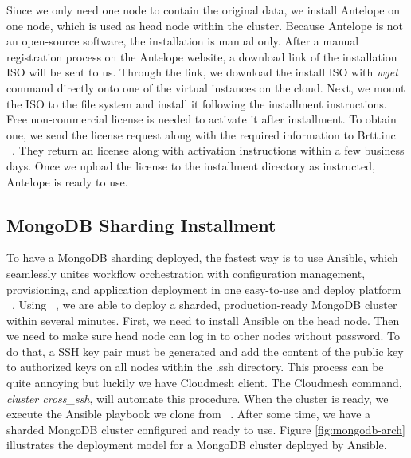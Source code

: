 \documentclass[9pt,twocolumn,twoside]{../../styles/osajnl}
\begin{document}
Since we only need one node to contain the original data, we install Antelope on one node, which is used as head node within the cluster. Because Antelope is not an open-source software, the installation is manual only. After a manual registration process on the Antelope website, a download link of the installation ISO will be sent to us. Through the link, we download the install ISO with \textit{wget} command directly onto one of the virtual instances on the cloud. Next, we mount the ISO to the file system and install it following the installment instructions. Free non-commercial license is needed to activate it after installment. To obtain one, we send the license request along with the required information to Brtt.inc ~\cite{www-brtt}. They return an license along with activation instructions within a few business days. Once we upload the license to the installment directory as instructed, Antelope is ready to use.


\subsection{MongoDB Sharding Installment}

To have a MongoDB sharding deployed, the fastest way is to use Ansible, which seamlessly unites workflow orchestration with configuration management, provisioning, and application deployment in one easy-to-use and deploy platform ~\cite{www-ansible}. Using ~\cite{www-ansimongo}, we are able to deploy a sharded, production-ready MongoDB cluster within several minutes. First, we need to install Ansible on the head node. Then we need to make sure head node can log in to other nodes without password. To do that, a SSH key pair must be generated and add the content of the public key to authorized keys on all nodes within the .ssh directory. This process can be quite annoying but luckily we have Cloudmesh client. The Cloudmesh command, \textit{cluster cross\_ssh}, will automate this procedure. When the cluster is ready, we execute the Ansible playbook we clone from ~\cite{www-ansimongo}. After some time, we have a sharded MongoDB cluster configured and ready to use. Figure \ref{fig:mongodb-arch} illustrates the deployment model for a MongoDB cluster deployed by Ansible.
\end{document}
